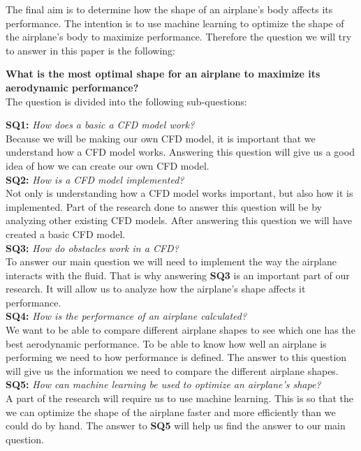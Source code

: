 \documentclass[a4paper,12pt,titlepage]{article}
\begin{document}
The final aim is to determine how the shape of an airplane's body affects its
performance. The intention is to use machine learning to optimize the shape of the airplane's body to maximize
performance. Therefore the question we will try to answer in this paper is the following:

\textbf{What is the most optimal shape for an airplane to maximize its aerodynamic performance?} \\

The question is divided into the following sub-questions:

\textbf{SQ1:} \textit{How does a basic a CFD model work?} \\
Because we will be making our own CFD model, it is important that we understand how a CFD model works. 
Answering this question will give us a good idea of how we can create our own CFD model. \\

\textbf{SQ2:} \textit{How is a CFD model implemented?} \\
Not only is understanding how a CFD model works important, but also how it is
implemented. Part of the research done to answer this question will be by analyzing
other existing CFD models. After answering this question we will have created a
basic CFD model. \\

\textbf{SQ3:} \textit{How do obstacles work in a CFD?} \\
To answer our main question we will need to implement the way the airplane interacts
with the fluid. That is why answering \textbf{SQ3} is an important part of our
research. It will allow us to analyze how the airplane's shape affects it performance. \\

\textbf{SQ4:} \textit{How is the performance of an airplane calculated?} \\
We want to be able to compare different airplane shapes to see which one has the
best aerodynamic performance. To be able to know how well an airplane is performing
we need to how performance is defined. The answer to this question will give us
the information we need to compare the different airplane shapes.\\

\textbf{SQ5:} \textit{How can machine learning be used to optimize an airplane's shape?} \\
A part of the research will require us to use machine learning. 
This is so that the we can optimize the shape of the airplane faster and more
efficiently than we could do by hand. The answer to \textbf{SQ5} will help us
find the answer to our main question. 
\end{document}
